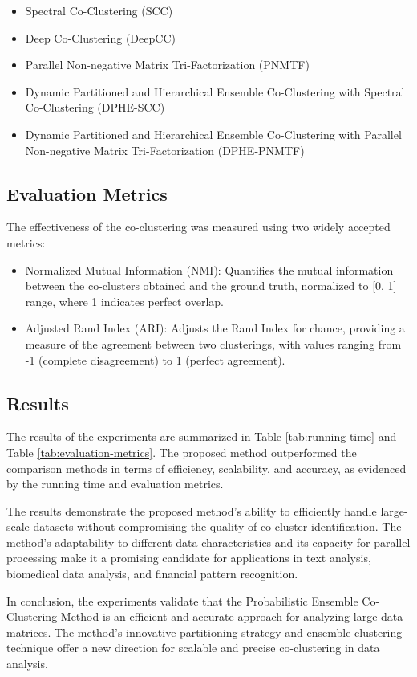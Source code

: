\begin{itemize}
    \item Spectral Co-Clustering (SCC)
    \item Deep Co-Clustering (DeepCC)
    \item Parallel Non-negative Matrix Tri-Factorization (PNMTF)
    \item Dynamic Partitioned and Hierarchical Ensemble Co-Clustering with Spectral Co-Clustering (DPHE-SCC)
    \item Dynamic Partitioned and Hierarchical Ensemble Co-Clustering with Parallel Non-negative Matrix Tri-Factorization (DPHE-PNMTF)
\end{itemize}

\subsection{Evaluation Metrics}
The effectiveness of the co-clustering was measured using two widely accepted metrics:

\begin{itemize}
    \item Normalized Mutual Information (NMI): Quantifies the mutual information between the co-clusters obtained and the ground truth, normalized to [0, 1] range, where 1 indicates perfect overlap.
    \item Adjusted Rand Index (ARI): Adjusts the Rand Index for chance, providing a measure of the agreement between two clusterings, with values ranging from -1 (complete disagreement) to 1 (perfect agreement).
\end{itemize}

\subsection{Results}
The results of the experiments are summarized in Table \ref{tab:running-time} and Table \ref{tab:evaluation-metrics}. The proposed method outperformed the comparison methods in terms of efficiency, scalability, and accuracy, as evidenced by the running time and evaluation metrics.

The results demonstrate the proposed method's ability to efficiently handle large-scale datasets without compromising the quality of co-cluster identification. The method's adaptability to different data characteristics and its capacity for parallel processing make it a promising candidate for applications in text analysis, biomedical data analysis, and financial pattern recognition.

In conclusion, the experiments validate that the Probabilistic Ensemble Co-Clustering Method is an efficient and accurate approach for analyzing large data matrices. The method's innovative partitioning strategy and ensemble clustering technique offer a new direction for scalable and precise co-clustering in data analysis.

